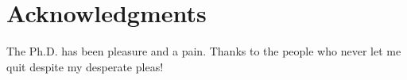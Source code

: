 \chapter*{Acknowledgments}
\label{ch:acknowledgments}

The Ph.D. has been pleasure and a pain.
Thanks to the people who never let me quit despite
my desperate pleas!
